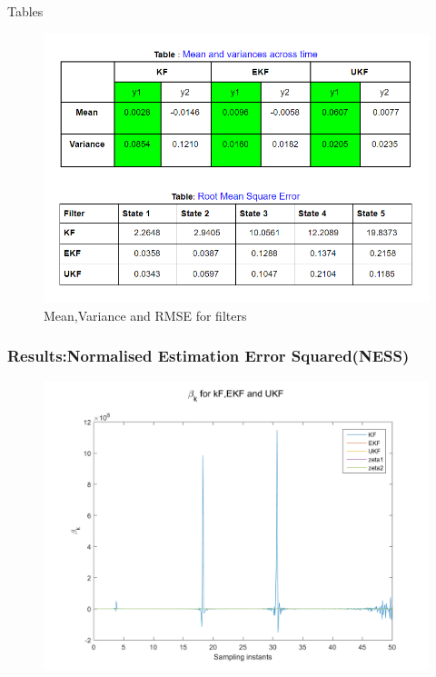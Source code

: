 \documentclass{beamer}
\begin{document}
\begin{frame}{Tables}
    \begin{figure}
        \centering
        \includegraphics[width=0.8\linewidth]{plots/tables.PNG}
        \caption{Mean,Variance and RMSE for filters}
        \label{fig:my_label}
    \end{figure}
\end{frame}
\begin{frame}
\frametitle{Results:Normalised Estimation Error Squared(NESS)}
\begin{figure}
\includegraphics[width=0.8\linewidth]{plots/betak_all.png}
\end{figure}
\end{frame}
\end{document}
